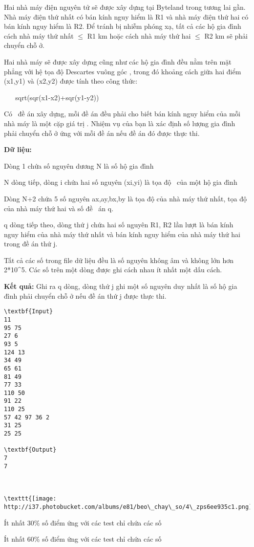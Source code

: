 

Hai nhà máy điện nguyên tử sẽ được xây dựng tại Byteland trong tương lai gần. Nhà máy điện thứ nhất có bán kính nguy hiểm là R1 và nhà máy điện thứ hai có bán kính nguy hiểm là R2. Để tránh bị nhiễm phóng xạ, tất cả các hộ gia đình cách nhà máy thứ nhất  $\le$ R1 km hoặc cách nhà máy thứ hai  $\le$ R2 km sẽ phải chuyển chỗ ở.

Hai nhà máy sẽ được xây dựng cũng như các hộ gia đình đều nằm trên mặt phẳng với hệ tọa độ Descartes vuông góc , trong đó khoảng cách giữa hai điểm (x1,y1) và (x2,y2) được tính theo công thức:

    sqrt(sqr(x1-x2)+sqr(y1-y2))

Có  đề án xây dựng, mỗi đề án đều phải cho biết bán kính nguy hiểm của mỗi nhà máy là một cặp giá trị . Nhiệm vụ của bạn là xác định số lượng gia đình phải chuyển chỗ ở ứng với mỗi đề án nếu đề án đó được thực thi.

\textbf{Dữ liệu:} 

Dòng 1 chứa số nguyên dương N là số hộ gia đình

N dòng tiếp, dòng i chứa hai số nguyên (xi,yi) là tọa độ  của một hộ gia đình

Dòng N+2 chứa 5 số nguyên ax,ay,bx,by là tọa độ của nhà máy thứ nhất, tọa độ của nhà máy thứ hai và số đề  án q.

q dòng tiếp theo, dòng thứ j chứa hai số nguyên R1, R2 lần lượt là bán kính nguy hiểm của nhà máy thứ nhất và bán kính nguy hiểm của nhà máy thứ hai trong đề án thứ j.

Tất cả các số trong file dữ liệu đều là số nguyên không âm và không lớn hơn 2*10^5. Các số trên một dòng được ghi cách nhau ít nhất một dấu cách.

\textbf{Kết quả: }Ghi ra q dòng, dòng thứ j ghi một số nguyên duy nhất là số hộ gia đình phải chuyển chỗ ở nếu đề án thứ j được thực thi.
\begin{verbatim}
\textbf{Input}
11
95 75
27 6
93 5
124 13
34 49
65 61
81 49
77 33
110 50
91 22
110 25
57 42 97 36 2
31 25
25 25

\textbf{Output}
7
7



\texttt{[image: http://i37.photobucket.com/albums/e81/beo\_chay\_so/4\_zps6ee935c1.png]}\end{verbatim}

Ít nhất 30\% số điểm ứng với các test chỉ chứa các số

Ít nhất 60\% số điểm ứng với các test chỉ chứa các số 
